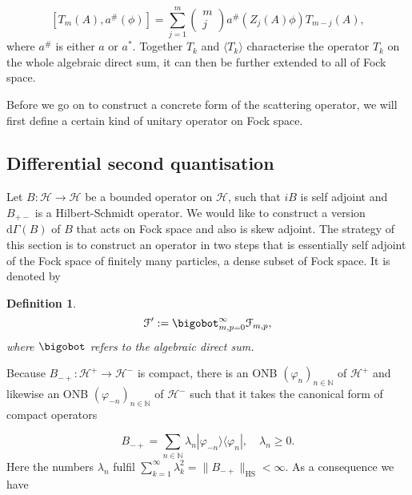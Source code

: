 \documentclass[b5paper,draft,openbib,12pt]{memoir}
\newtheorem{Def}{Definition}
\begin{document}
\begin{equation}\label{logarithmic lift condition}
\left[T_m(A) , a^\# (\phi)\right]= \sum_{j=1}^{m} \begin{pmatrix} m \\ j \end{pmatrix} a^\# \left(Z_j (A) \phi \right) T_{m-j}(A), 
\end{equation}
where \(a^\#\) is either \(a\) or \(a^*\). Together \(T_k\) and \(\langle T_k\rangle\) characterise the operator \(T_k\) on the whole algebraic
direct sum, it can then be further extended to all of Fock space.

Before we go on to construct a concrete form of the scattering operator, we will first define a certain kind of unitary operator on Fock space.

\subsection{Differential second quantisation}

Let \(B:\mathcal{H}\rightarrow\mathcal{H}\) be a bounded
operator on \(\mathcal{H}\), such that \(i B\) is self adjoint and \(B_{+-}\) is a Hilbert-Schmidt operator. 
We would like to construct a version \(\mathrm{d}\Gamma(B)\) of \(B\) that acts on Fock space and also is skew adjoint.
The strategy of this section is to construct an operator in two steps that is essentially self adjoint of the Fock space of 
finitely many particles, a dense subset of Fock space. It is denoted by

\begin{Def}
\begin{equation}
\mathcal{F}':=\bigobot_{m,p=0}^\infty \mathcal{F}_{m,p},
\end{equation}
where \(\bigobot\) refers to the algebraic direct sum.
\end{Def}
Because \(B_{-+}:\mathcal{H}^+\rightarrow \mathcal{H}^-\) is compact, there is an ONB \((\varphi_n)_{n\in\mathbb{N}}\) 
of \(\mathcal{H}^+\) and likewise an ONB \((\varphi_{-n})_{n\in\mathbb{N}}\) of \(\mathcal{H}^-\) such that it takes the canonical form 
of compact operators

\begin{equation}
B_{-+} = \sum_{n\in\mathbb{N}} \lambda_n |\varphi_{-n}\rangle \langle \varphi_{n}|, \quad \lambda_n \ge 0.
\end{equation}
Here the numbers \(\lambda_n\) fulfil \(\sum_{k=1}^\infty \lambda_k^2 = \|B_{-+}\|_{\text{HS}}<\infty\). As a consequence we have
\end{document}
